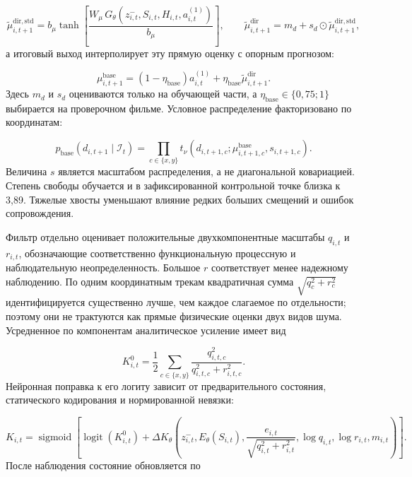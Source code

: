 \documentclass[11pt,a4paper]{article}
\begin{document}
\begin{equation}
\widetilde\mu^{\mathrm{dir,std}}_{i,t+1}
=
b_\mu\tanh\left[
\frac{W_\mu\,G_\theta(z^-_{i,t},S_{i,t},H_{i,t},a_{i,t}^{(1)})}{b_\mu}
\right],
\qquad
\widetilde\mu^{\mathrm{dir}}_{i,t+1}
=m_d+s_d\odot\widetilde\mu^{\mathrm{dir,std}}_{i,t+1},
\end{equation}
а итоговый выход интерполирует эту прямую оценку с опорным прогнозом:

\begin{equation}
\mu^{\mathrm{base}}_{i,t+1}
=(1-\eta_{\mathrm{base}})a^{(1)}_{i,t}
+\eta_{\mathrm{base}}\widetilde\mu^{\mathrm{dir}}_{i,t+1}.
\end{equation}
Здесь $m_d$ и $s_d$ оцениваются только на обучающей части, а $\eta_{\mathrm{base}}\in\{0{,}75;1\}$ выбирается на проверочном фильме. Условное распределение факторизовано по координатам:

\begin{equation}
p_{\mathrm{base}}(d_{i,t+1}\mid\mathcal I_t)
=
\prod_{c\in\{x,y\}}
t_\nu\!\left(d_{i,t+1,c};\mu^{\mathrm{base}}_{i,t+1,c},s_{i,t+1,c}\right).
\end{equation}
Величина $s$ является масштабом распределения, а не диагональной ковариацией. Степень свободы обучается и в зафиксированной контрольной точке близка к 3,89. Тяжелые хвосты уменьшают влияние редких больших смещений и ошибок сопровождения.

Фильтр отдельно оценивает положительные двухкомпонентные масштабы $q_{i,t}$ и $r_{i,t}$, обозначающие соответственно функциональную процессную и наблюдательную неопределенность. Большое $r$ соответствует менее надежному наблюдению. По одним координатным трекам квадратичная сумма $\sqrt{q_c^2+r_c^2}$ идентифицируется существенно лучше, чем каждое слагаемое по отдельности; поэтому они не трактуются как прямые физические оценки двух видов шума. Усредненное по компонентам аналитическое усиление имеет вид

\begin{equation}
K^0_{i,t}
=\frac{1}{2}\sum_{c\in\{x,y\}}
\frac{q^2_{i,t,c}}{q^2_{i,t,c}+r^2_{i,t,c}}.
\end{equation}
Нейронная поправка к его логиту зависит от предварительного состояния, статического кодирования и нормированной невязки:

\begin{equation}
K_{i,t}=\operatorname{sigmoid}
\left[
\operatorname{logit}(K^0_{i,t})
+\Delta K_\theta\left(
z^-_{i,t},E_\theta(S_{i,t}),
\frac{e_{i,t}}{\sqrt{q^2_{i,t}+r^2_{i,t}}},
\log q_{i,t},\log r_{i,t},m_{i,t}
\right)
\right].
\end{equation}
После наблюдения состояние обновляется по
\end{document}
